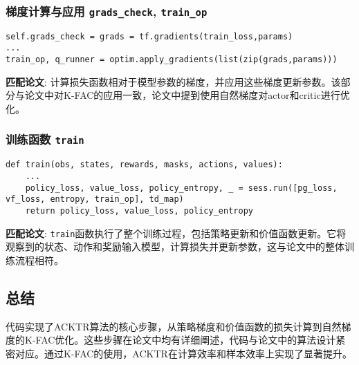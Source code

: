 \documentclass[twocolumn, 10pt]{article} %
\theoremstyle{remark}
\begin{document}
\subsubsection{梯度计算与应用 \texttt{grads\_check}, \texttt{train\_op}}
\begin{lstlisting}[backgroundcolor=\color{lightgray}]
self.grads_check = grads = tf.gradients(train_loss,params)
...
train_op, q_runner = optim.apply_gradients(list(zip(grads,params)))
\end{lstlisting}
\noindent \textbf{匹配论文}: 计算损失函数相对于模型参数的梯度，并应用这些梯度更新参数。该部分与论文中对K-FAC的应用一致，论文中提到使用自然梯度对actor和critic进行优化。

\subsubsection{训练函数 \texttt{train}}
\begin{lstlisting}[backgroundcolor=\color{lightgray}]
def train(obs, states, rewards, masks, actions, values):
    ...
    policy_loss, value_loss, policy_entropy, _ = sess.run([pg_loss, vf_loss, entropy, train_op], td_map)
    return policy_loss, value_loss, policy_entropy
\end{lstlisting}
\noindent \textbf{匹配论文}: \texttt{train}函数执行了整个训练过程，包括策略更新和价值函数更新。它将观察到的状态、动作和奖励输入模型，计算损失并更新参数，这与论文中的整体训练流程相符。

\subsection{总结}
代码实现了ACKTR算法的核心步骤，从策略梯度和价值函数的损失计算到自然梯度的K-FAC优化。这些步骤在论文中均有详细阐述，代码与论文中的算法设计紧密对应。通过K-FAC的使用，ACKTR在计算效率和样本效率上实现了显著提升。
\end{document}
